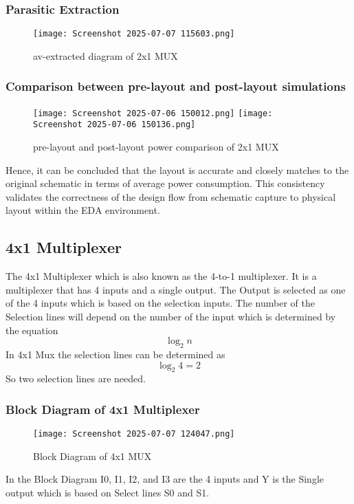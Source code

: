 \documentclass[12pt]{article}
\begin{document}
    \subsubsection{Parasitic Extraction}
        \begin{figure}[H]
            \centering
            \texttt{[image: Screenshot 2025-07-07 115603.png]}
            \caption{av-extracted diagram of 2x1 MUX}
            \label{fig:enter-label}
        \end{figure}

    \subsubsection{Comparison between pre-layout and post-layout simulations}
      \begin{figure}[H]
          \centering
          \texttt{[image: Screenshot 2025-07-06 150012.png]}
          \texttt{[image: Screenshot 2025-07-06 150136.png]}
          \caption{pre-layout and post-layout power comparison of 2x1 MUX}
          \label{fig:enter-label}
      \end{figure}
       Hence, it can be concluded that the layout is accurate and closely matches to the original schematic in terms of average power consumption. This consistency validates the correctness of the design flow from schematic capture to physical layout within the EDA environment.

 \subsection{\large{\textbf{4x1 Multiplexer}}}

   The 4x1 Multiplexer which is also known as the 4-to-1 multiplexer. It is a multiplexer that has 4 inputs and a single output. The Output is selected as one of the 4 inputs which is based on the selection inputs. The number of the Selection lines will depend on the number of the input which is determined by the equation \[ \log_{2}n \]In 4x1 Mux the selection lines can be determined as \[ \log_{2}4=2 \] So two selection lines  are needed.
    \subsubsection{Block Diagram of 4x1 Multiplexer}
    
    \begin{figure}[H]
        \centering
        \texttt{[image: Screenshot 2025-07-07 124047.png]}
        \caption{Block Diagram of 4x1 MUX}
        \label{fig:enter-label}
    \end{figure}
     In the Block Diagram I0, I1, I2, and I3 are the 4 inputs and Y is the Single output which is based on Select lines S0 and S1.
    
\end{document}

